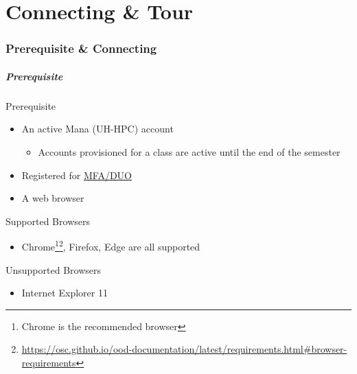 \part{Connecting \& Tour}
\begin{frame}
			 \partpage
\end{frame}

\section[Connecting]{Prerequisite \& Connecting}
\begin{frame}
\frametitle{Prerequisite}
		\begin{block}{Prerequisite}
			\begin{itemize}
				\item An active Mana (UH-HPC) account
				\begin{itemize}
				\item Accounts provisioned for a class are active until the end of the semester
				\end{itemize}
				\item Registered for \href{http://www.hawaii.edu/its/uhlogin/}{MFA/DUO}
				\item A web browser 
			\end{itemize}
			\end{block}
			\begin{exampleblock}{Supported Browsers}
			\begin{itemize}
				\item Chrome\footnote[1,frame]{\tiny Chrome is the recommended browser}\footnote[2,frame]{\tiny \url{https://osc.github.io/ood-documentation/latest/requirements.html\#browser-requirements}}, Firefox, Edge are all supported
		\end{itemize}
		\end{exampleblock}
			\begin{alertblock}{Unsupported Browsers}
			\begin{itemize}
				\item Internet Explorer 11
		\end{itemize}
				\end{alertblock}
\end{frame}

